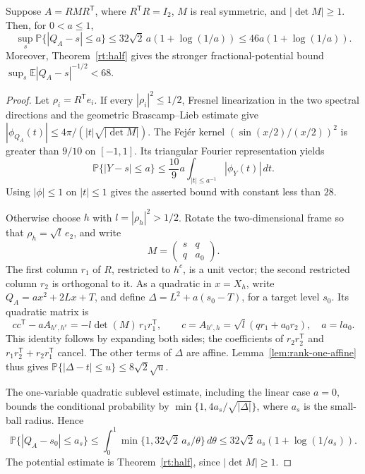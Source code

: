 \begin{theorem}
\label{thm:rank-two-affine}
Suppose \(A=RMR^{\mathsf T}\), where \(R^{\mathsf T}R=I_2\),
\(M\) is real symmetric, and \(|\det M|\geq1\).
Then, for \(0<a\leq1\),
\[
 \sup_s\mathbb P\{|Q_A-s|\leq a\}
 \leq32\sqrt2\,a(1+\log(1/a))\leq46a(1+\log(1/a)).
\]
Moreover, Theorem~\ref{rt:half} gives the stronger fractional-potential bound
\(\sup_s\mathbb E|Q_A-s|^{-1/2}<68\).
\end{theorem}
\begin{proof}
Let \(\rho_i=R^{\mathsf T}e_i\).
If every \(|\rho_i|^2\leq1/2\), Fresnel linearization in the
two spectral directions and the geometric
Brascamp--Lieb estimate give
\(|\phi_{Q_A}(t)|\leq4\pi/(|t|\sqrt{|\det M|})\).
The Fej\'er kernel
\((\sin(x/2)/(x/2))^2\) is greater than \(9/10\) on \([-1,1]\).
Its triangular Fourier representation yields
\[
 \mathbb P\{|Y-s|\leq a\}
 \leq\frac{10}{9}a\int_{|t|\leq a^{-1}}|\phi_Y(t)|\,dt.
\]
Using \(|\phi|\leq1\) on \(|t|\leq1\) gives the asserted
bound with constant less than \(28\).

Otherwise choose \(h\) with \(l=|\rho_h|^2>1/2\).
Rotate the two-dimensional frame so that
\(\rho_h=\sqrt l\,e_2\), and write
\[
 M=\begin{pmatrix}s&q\\q&a_0\end{pmatrix}.
\]
The first column \(r_1\) of \(R\), restricted to \(h^c\), is
a unit vector; the second restricted column \(r_2\) is
orthogonal to it.  As a quadratic in \(x=X_h\), write
\(Q_A=ax^2+2Lx+T\), and define
\(\Delta=L^2+a(s_0-T)\), for a target level \(s_0\).
Its quadratic matrix is
\[
 cc^{\mathsf T}-aA_{h^c,h^c}
 =-l\det(M)\,r_1r_1^{\mathsf T},
 \qquad
 c=A_{h^c,h}=\sqrt l(qr_1+a_0r_2),\quad a=la_0.
\]
This identity follows by expanding both sides; the coefficients
of \(r_2r_2^{\mathsf T}\) and
\(r_1r_2^{\mathsf T}+r_2r_1^{\mathsf T}\) cancel.
The other terms of \(\Delta\) are affine.
Lemma~\ref{lem:rank-one-affine} thus gives
\(\mathbb P\{|\Delta-t|\leq u\}\leq8\sqrt2\sqrt u\).

The one-variable quadratic sublevel estimate, including the
linear case \(a=0\), bounds the conditional probability by
\(\min\{1,4a_{\!s}/\sqrt{|\Delta|}\}\), where \(a_{\!s}\)
is the small-ball radius.  Hence
\[
 \mathbb P\{|Q_A-s_0|\leq a_{\!s}\}
 \leq\int_0^1\min\{1,32\sqrt2\,a_{\!s}/\theta\}\,d\theta
 \leq32\sqrt2\,a_{\!s}(1+\log(1/a_{\!s})).
\]
The potential estimate is Theorem~\ref{rt:half}, since
\(|\det M|\geq1\).
\end{proof}

